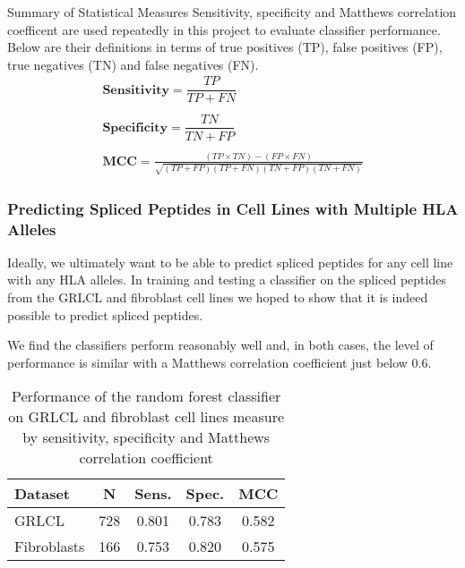 \documentclass[10pt,a4paper,twoside,twocolumn]{article}
\begin{document}
\begin{mybox}{Summary of Statistical Measures}
	\small 
Sensitivity, specificity and Matthews correlation coefficent are used repeatedly in this project to evaluate classifier performance. Below are their definitions in terms of true positives (TP), false positives (FP), true negatives (TN) and false negatives (FN).
	\tiny
	\begin{equation*}
	\begin{gathered}
	\textbf{Sensitivity} =  \dfrac{TP}{TP+FN} \\\\
	 \textbf{Specificity}= \dfrac{TN}{TN+FP} \\\\
	 \textbf{MCC} = \frac{(TP\times TN) - (FP\times FN)}{\sqrt{(TP+FP)(TP+FN)(TN+FP)(TN+FN)}}
	\end{gathered}
	\end{equation*}
\end{mybox}
\normalsize


\begin{table}
	\centering
	
	\caption{Matthews correlation coefficients for the best performing classifiers of each type - random forest, RF, neural network, NN, and support vector machine, SVM - evaluated on the test sets}
	\label{MCC-all}
\end{table}

\subsubsection*{Predicting Spliced Peptides in Cell Lines with Multiple HLA Alleles}

Ideally, we ultimately want to be able to predict spliced peptides for any cell line with any HLA alleles. In training and testing a classifier on the spliced peptides from the GRLCL and fibroblast cell lines we hoped to show that it is indeed possible to predict spliced peptides.

We find the classifiers perform reasonably well and, in both cases, the level of performance is similar with a Matthews correlation coefficient just below 0.6.

\begin{table}
	\centering
	\begin{tabular}{lcccc}
		\toprule
		Dataset & N & Sens. & Spec. & MCC \\ 
		\midrule
		GRLCL & 728 & 0.801 & 0.783 & 0.582 \\
		Fibroblasts & 166 & 0.753 & 0.820 & 0.575 \\
		\bottomrule
	\end{tabular}
	\caption{Performance of the random forest classifier on GRLCL and fibroblast cell lines measure by sensitivity, specificity and Matthews correlation coefficient}
	\label{GRLCL-fibroblast-predictions}
\end{table}
\end{document}
